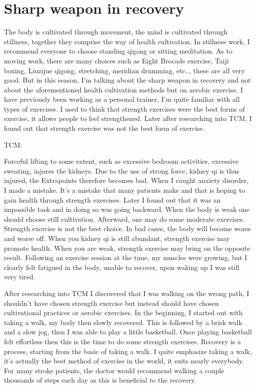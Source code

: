 \documentclass[
]{book}
\begin{document}
\hypertarget{sharp-weapon-in-recovery}{%
\section{Sharp weapon in recovery}\label{sharp-weapon-in-recovery}}

The body is cultivated through movement, the mind is cultivated through stillness, together they comprise the way of health cultivation. In stillness work, I recommend everyone to choose standing qigong or sitting meditation. As to moving work, there are many choices such as Eight Brocade exercise, Taiji boxing, Liuzijue qigong, stretching, meridian drumming, etc.., these are all very good. But in this season, I'm talking about the sharp weapon in recovery and not about the aforementioned health cultivation methods but on aerobic exercise. I have previously been working as a personal trainer, I'm quite familiar with all types of exercises. I used to think that strength exercises were the best forms of exercise, it allows people to feel strengthened. Later after researching into TCM, I found out that strength exercise was not the best form of exercise.

TCM:

Forceful lifting to some extent, such as excessive bedroom activities, excessive sweating, injures the kidneys.
Due to the use of strong force, kidney qi is thus injured, the Extrapoints therefore becomes bad.
When I caught anxiety disorder, I made a mistake. It's a mistake that many patients make and that is hoping to gain health through strength exercises. Later I found out that it was an impossible task and in doing so was going backward. When the body is weak one should choose still cultivation. Afterward, one may do some moderate exercises. Strength exercise is not the best choice. In bad cases, the body will become worse and worse off. When you kidney qi is still abundant, strength exercise may promote health. When you are weak, strength exercise may bring on the opposite result. Following an exercise session at the time, my muscles were growing, but I clearly felt fatigued in the body, unable to recover, upon waking up I was still very tired.

After researching into TCM I discovered that I was walking on the wrong path, I shouldn't have chosen strength exercise but instead should have chosen cultivational practices or aerobic exercises. In the beginning, I started out with taking a walk, my body then slowly recovered. This is followed by a brisk walk and a slow jog, then I was able to play a little basketball. Once playing basketball felt effortless then this is the time to do some strength exercises. Recovery is a process, starting from the basic of taking a walk. I quite emphasize taking a walk, it's actually the best method of exercise in the world, it suits nearly everybody. For many stroke patients, the doctor would recommend walking a couple thousands of steps each day as this is beneficial to the recovery.
\end{document}
